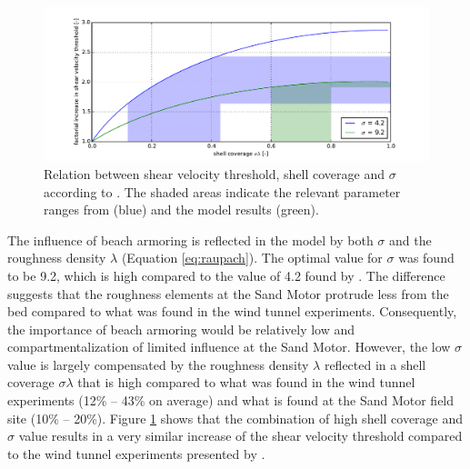 \begin{figure}
  \centering
\includegraphics[width=\columnwidth]{../Figures/sigma}
\caption{Relation between shear velocity threshold, shell coverage and
  $\sigma$ according to \citet[][Equation
  \ref{eq:raupach}]{Raupach1993}. The shaded areas indicate the
  relevant parameter ranges from \citet{McKennaNeuman2012} (blue) and
  the model results (green).}
  \label{fig:sigma}
\end{figure}

The influence of beach armoring is reflected in the model by both
$\sigma$ and the roughness density $\lambda$ (Equation
\ref{eq:raupach}). The optimal value for $\sigma$ was found to be 9.2,
which is high compared to the value of 4.2 found by
\citet{McKennaNeuman2012}. The difference suggests that the roughness
elements at the Sand Motor protrude less from the bed compared to what
was found in the wind tunnel experiments. Consequently, the importance
of beach armoring would be relatively low and compartmentalization of
limited influence at the Sand Motor. However, the low $\sigma$ value
is largely compensated by the roughness density $\lambda$ reflected in
a shell coverage $\sigma \lambda$ that is high compared to what was
found in the wind tunnel experiments (12\% -- 43\% on average) and
what is found at the Sand Motor field site (10\% -- 20\%). Figure
\ref{fig:sigma} shows that the combination of high shell coverage and
$\sigma$ value results in a very similar increase of the shear
velocity threshold compared to the wind tunnel experiments presented
by \citet{McKennaNeuman2012}.

